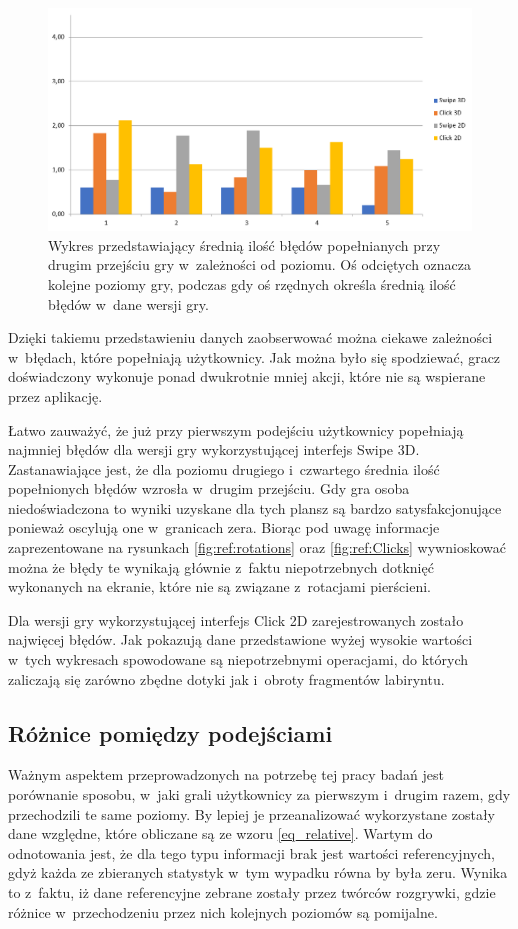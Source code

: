\documentclass[a4paper,12pt,numbers=noenddot]{report}
\begin{document}
\begin{figure}[h!]
	\centering
  	\includegraphics[width=\linewidth]{diag/errors_2.png}
	\caption{Wykres przedstawiający średnią ilość błędów popełnianych przy drugim przejściu gry w~zależności od poziomu. Oś odciętych oznacza kolejne poziomy gry, podczas gdy oś rzędnych określa średnią ilość błędów w~dane wersji gry.}
	\label{fig:diag_errors_2}
\end{figure}

Dzięki takiemu przedstawieniu danych zaobserwować można ciekawe zależności w~błędach, które popełniają użytkownicy. Jak można było się spodziewać, gracz doświadczony wykonuje ponad dwukrotnie mniej akcji, które nie są wspierane przez aplikację. 

Łatwo zauważyć, że już przy pierwszym podejściu użytkownicy popełniają najmniej błędów dla wersji gry wykorzystującej interfejs Swipe 3D. Zastanawiające jest, że dla poziomu drugiego i~czwartego średnia ilość popełnionych błędów wzrosła w~drugim przejściu. Gdy gra osoba niedoświadczona to wyniki uzyskane dla tych plansz są bardzo satysfakcjonujące ponieważ oscylują one w~granicach zera. Biorąc pod uwagę informacje zaprezentowane na rysunkach \ref{fig:ref:rotations} oraz \ref{fig:ref:Clicks} wywnioskować można że błędy te wynikają głównie z~faktu niepotrzebnych dotknięć wykonanych na ekranie, które nie są związane z~rotacjami pierścieni.

Dla wersji gry wykorzystującej interfejs Click 2D zarejestrowanych zostało najwięcej błędów. Jak pokazują dane przedstawione wyżej wysokie wartości w~tych wykresach spowodowane są niepotrzebnymi operacjami, do których zaliczają się zarówno zbędne dotyki jak i~obroty fragmentów labiryntu.

\subsection{Różnice pomiędzy podejściami}
Ważnym aspektem przeprowadzonych na potrzebę tej pracy badań jest porównanie sposobu, w~jaki grali użytkownicy za pierwszym i~drugim razem, gdy przechodzili te same poziomy. By lepiej je przeanalizować wykorzystane zostały dane względne, które obliczane są ze wzoru \ref{eq_relative}. Wartym do odnotowania jest, że dla tego typu informacji brak jest wartości referencyjnych, gdyż każda ze zbieranych statystyk w~tym wypadku równa by była zeru. Wynika to z~faktu, iż dane referencyjne zebrane zostały przez twórców rozgrywki, gdzie różnice w~przechodzeniu przez nich kolejnych poziomów są pomijalne.
\end{document}
